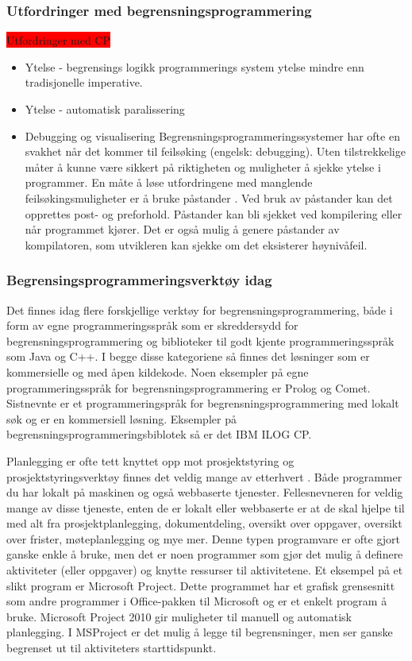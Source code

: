 \subsubsection{Utfordringer med begrensningsprogrammering}
\colorbox{red}{Utfordringer med CP}
\begin{itemize}
\item Ytelse - begrensings logikk programmerings system ytelse mindre enn tradisjonelle imperative.
\item Ytelse - automatisk paralissering
\item Debugging og visualisering
Begrensningsprogrammeringssystemer har ofte en svakhet når det kommer til feilsøking (engelsk: debugging). Uten tilstrekkelige måter å kunne være sikkert på riktigheten og muligheter å sjekke ytelse i programmer. En måte å løse utfordringene med manglende feilsøkingsmuligheter er å bruke påstander . Ved bruk av påstander kan det opprettes post- og preforhold. Påstander kan bli sjekket ved kompilering eller når programmet kjører. Det er også mulig å genere påstander av kompilatoren, som utvikleren kan sjekke om det eksisterer høynivåfeil\cite{challengesManuel}.
\end{itemize}

\subsubsection{Begrensingsprogrammeringsverktøy idag}
Det finnes idag flere forskjellige verktøy for begrensningsprogrammering, både i form av egne programmeringsspråk som er skreddersydd for begrensningsprogrammering og biblioteker til godt kjente programmeringsspråk som Java og C++. I begge disse kategoriene så finnes det løsninger som er kommersielle og med åpen kildekode. Noen eksempler på egne programmeringsspråk for begrensningsprogrammering er Prolog og Comet. Sistnevnte er et programmeringspråk for begrensningsprogrammering med lokalt søk og er en kommersiell løsning. Eksempler på begrensningsprogrammeringsbiblotek så er det IBM ILOG CP.

Planlegging er ofte tett knyttet opp mot prosjektstyring og prosjektstyringsverktøy finnes det veldig mange av etterhvert \cite{projectmanagmenttoolswiki}. Både programmer du har lokalt på maskinen og også webbaserte tjenester. Fellesnevneren for veldig mange av disse tjeneste, enten de er lokalt eller webbaserte er at de skal hjelpe til med alt fra prosjektplanlegging, dokumentdeling, oversikt over oppgaver, oversikt over frister, møteplanlegging og mye mer. Denne typen programvare er ofte gjort ganske enkle å bruke, men det er noen programmer som gjør det mulig å definere aktiviteter (eller oppgaver) og knytte ressurser til aktivitetene. Et eksempel på et slikt program er Microsoft Project. Dette programmet har et grafisk grensesnitt som andre programmer i Office-pakken til Microsoft og er et enkelt program å bruke. Microsoft Project 2010 gir muligheter til manuell og automatisk planlegging\cite{msproject2010blog}. I MSProject er det mulig å legge til begrensninger, men ser ganske begrenset ut til aktiviteters starttidspunkt\cite{begrensingermsproject}.


